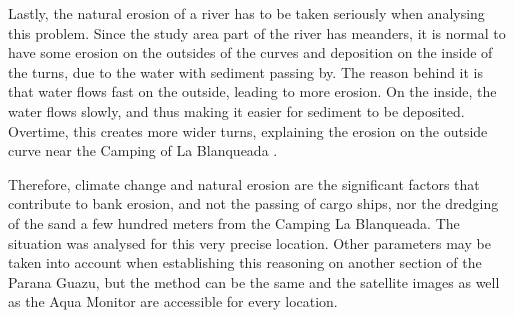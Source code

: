 Lastly, the natural erosion of a river has to be taken seriously when analysing this problem. Since the study area part of the river has meanders, it is normal to have some erosion on the outsides of the curves and deposition on the inside of the turns, due to the water with sediment passing by. The reason behind it is that water flows fast on the outside, leading to more erosion. On the inside, the water flows slowly, and thus making it easier for sediment to be deposited. Overtime, this creates more wider turns, explaining the erosion on the outside curve near the Camping of La Blanqueada \autocite{serenani}.

Therefore, climate change and natural erosion are the significant factors that contribute to bank erosion, and not the passing of cargo ships, nor the dredging of the sand a few hundred meters from the Camping La Blanqueada.
The situation was analysed for this very precise location. Other parameters may be taken into account when establishing this reasoning on another section of the Parana Guazu, but the method can be the same and the satellite images as well as the Aqua Monitor are accessible for every location. 

 